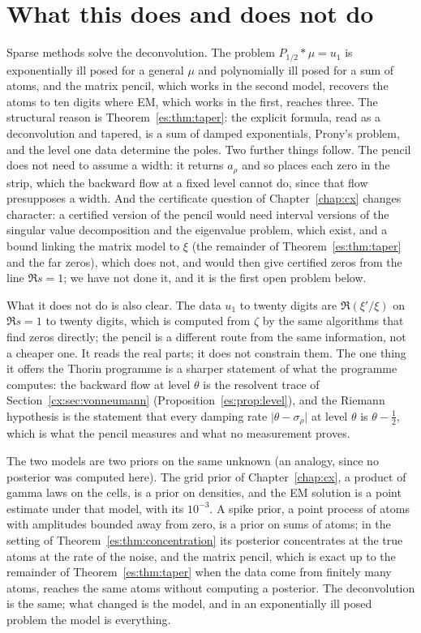 \section{What this does and does not do}

Sparse methods solve the deconvolution. The problem $P_{1/2}*\mu=u_1$ is exponentially ill posed for a general $\mu$ and polynomially ill posed for a sum of atoms, and the matrix pencil, which works in the second model, recovers the atoms to ten digits where EM, which works in the first, reaches three. The structural reason is Theorem~\ref{es:thm:taper}: the explicit formula, read as a deconvolution and tapered, is a sum of damped exponentials, Prony's problem, and the level one data determine the poles. Two further things follow. The pencil does not need to assume a width: it returns $a_\rho$ and so places each zero in the strip, which the backward flow at a fixed level cannot do, since that flow presupposes a width. And the certificate question of Chapter~\ref{chap:cx} changes character: a certified version of the pencil would need interval versions of the singular value decomposition and the eigenvalue problem, which exist, and a bound linking the matrix model to $\xi$ (the remainder of Theorem~\ref{es:thm:taper} and the far zeros), which does not, and would then give certified zeros from the line $\Re s=1$; we have not done it, and it is the first open problem below.

What it does not do is also clear. The data $u_1$ to twenty digits are $\Re(\xi'/\xi)$ on $\Re s=1$ to twenty digits, which is computed from $\zeta$ by the same algorithms that find zeros directly; the pencil is a different route from the same information, not a cheaper one. It reads the real parts; it does not constrain them. The one thing it offers the Thorin programme is a sharper statement of what the programme computes: the backward flow at level $\theta$ is the resolvent trace of Section~\ref{cx:sec:vonneumann} (Proposition~\ref{es:prop:level}), and the Riemann hypothesis is the statement that every damping rate $\lvert\theta-\sigma_\rho\rvert$ at level $\theta$ is $\theta-\tfrac12$, which is what the pencil measures and what no measurement proves.

The two models are two priors on the same unknown (an analogy, since no posterior was computed here). The grid prior of Chapter~\ref{chap:cx}, a product of gamma laws on the cells, is a prior on densities, and the EM solution is a point estimate under that model, with its $10^{-3}$. A spike prior, a point process of atoms with amplitudes bounded away from zero, is a prior on sums of atoms; in the setting of Theorem~\ref{es:thm:concentration} its posterior concentrates at the true atoms at the rate of the noise, and the matrix pencil, which is exact up to the remainder of Theorem~\ref{es:thm:taper} when the data come from finitely many atoms, reaches the same atoms without computing a posterior. The deconvolution is the same; what changed is the model, and in an exponentially ill posed problem the model is everything.

